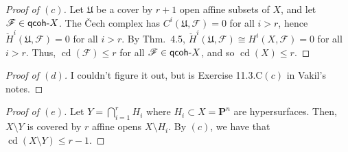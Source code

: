 \documentclass[10pt]{article}
\theoremstyle{definition}
\theoremstyle{remark}
\numberwithin{equation}{section}
\numberwithin{figure}{subsubsection}
\DeclareMathOperator{\cd}{cd}
\newcommand{\FF}{\mathscr{F}}
\newcommand{\qcoh}{\mathsf{qcoh}\mathchar`-}
\begin{document}
\begin{proof}[Proof of $(c)$]
  Let $\mathfrak{U}$ be a cover by $r+1$ open affine subsets of $X$, and let
  $\FF \in \qcoh X$. The \v{C}ech complex has $C^i(\mathfrak{U},\FF) = 0$ for
  all $i > r$, hence $\check{H}^i(\mathfrak{U},\FF) = 0$ for all $i > r$. By
  Thm.\ 4.5, $\check{H}^i(\mathfrak{U},\FF) \cong H^i(X,\FF) = 0$ for all $i >
  r$. Thus, $\cd(\FF) \le r$ for all $\FF \in \qcoh X$, and so $\cd(X) \le r$.
\end{proof}
\begin{proof}[Proof of $(d)$]
  I couldn't figure it out, but is Exercise 11.3.C$(c)$ in Vakil's
  notes.
\end{proof}
\begin{proof}[Proof of $(e)$]
  Let $Y = \bigcap_{i=1}^r H_i$ where $H_i \subset X = \mathbf{P}^n$ are
  hypersurfaces. Then, $X \setminus Y$ is covered by $r$ affine opens $X
  \setminus H_i$. By $(c)$, we have that $\cd(X \setminus Y) \le r-1$.
\end{proof}
\end{document}
